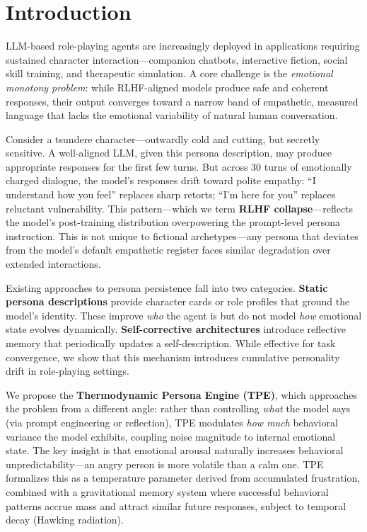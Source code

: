 \section{Introduction}

LLM-based role-playing agents are increasingly deployed in applications requiring sustained character interaction---companion chatbots, interactive fiction, social skill training, and therapeutic simulation. A core challenge is the \emph{emotional monotony problem}: while RLHF-aligned models produce safe and coherent responses, their output converges toward a narrow band of empathetic, measured language that lacks the emotional variability of natural human conversation.

Consider a tsundere character---outwardly cold and cutting, but secretly sensitive. A well-aligned LLM, given this persona description, may produce appropriate responses for the first few turns. But across 30 turns of emotionally charged dialogue, the model's responses drift toward polite empathy: ``I understand how you feel'' replaces sharp retorts; ``I'm here for you'' replaces reluctant vulnerability. This pattern---which we term \textbf{RLHF collapse}---reflects the model's post-training distribution overpowering the prompt-level persona instruction. This is not unique to fictional archetypes---any persona that deviates from the model's default empathetic register faces similar degradation over extended interactions.

Existing approaches to persona persistence fall into two categories. \textbf{Static persona descriptions} \cite{zhang2018personalizing,zhou2023characterglm,wang2023rolellm} provide character cards or role profiles that ground the model's identity. These improve \emph{who} the agent is but do not model \emph{how} emotional state evolves dynamically. \textbf{Self-corrective architectures} \cite{park2023generative,shinn2023reflexion} introduce reflective memory that periodically updates a self-description. While effective for task convergence, we show that this mechanism introduces cumulative personality drift in role-playing settings.

We propose the \textbf{Thermodynamic Persona Engine (TPE)}, which approaches the problem from a different angle: rather than controlling \emph{what} the model says (via prompt engineering or reflection), TPE modulates \emph{how much} behavioral variance the model exhibits, coupling noise magnitude to internal emotional state. The key insight is that emotional arousal naturally increases behavioral unpredictability---an angry person is more volatile than a calm one. TPE formalizes this as a temperature parameter derived from accumulated frustration, combined with a gravitational memory system where successful behavioral patterns accrue mass and attract similar future responses, subject to temporal decay (Hawking radiation).

